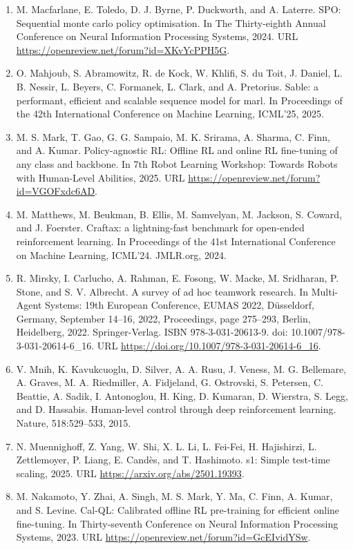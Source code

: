 \documentclass[11pt,UTF8,fontset=fandol]{ctexart}
\begin{document}
\begin{enumerate}[leftmargin=2em,itemsep=2pt]
\item M. Macfarlane, E. Toledo, D. J. Byrne, P. Duckworth, and A. Laterre. SPO: Sequential monte carlo policy optimisation. In The Thirty-eighth Annual Conference on Neural Information Processing Systems, 2024. URL \url{https://openreview.net/forum?id=XKvYcPPH5G}.
\item O. Mahjoub, S. Abramowitz, R. de Kock, W. Khlifi, S. du Toit, J. Daniel, L. B. Nessir, L. Beyers, C. Formanek, L. Clark, and A. Pretorius. Sable: a performant, efficient and scalable sequence model for marl. In Proceedings of the 42th International Conference on Machine Learning, ICML'25, 2025.
\item M. S. Mark, T. Gao, G. G. Sampaio, M. K. Srirama, A. Sharma, C. Finn, and A. Kumar. Policy-agnostic RL: Offline RL and online RL fine-tuning of any class and backbone. In 7th Robot Learning Workshop: Towards Robots with Human-Level Abilities, 2025. URL \url{https://openreview.net/forum?id=VGOFxdc6AD}.
\item M. Matthews, M. Beukman, B. Ellis, M. Samvelyan, M. Jackson, S. Coward, and J. Foerster. Craftax: a lightning-fast benchmark for open-ended reinforcement learning. In Proceedings of the 41st International Conference on Machine Learning, ICML'24. JMLR.org, 2024.
\item R. Mirsky, I. Carlucho, A. Rahman, E. Fosong, W. Macke, M. Sridharan, P. Stone, and S. V. Albrecht. A survey of ad hoc teamwork research. In Multi-Agent Systems: 19th European Conference, EUMAS 2022, D\"usseldorf, Germany, September 14--16, 2022, Proceedings, page 275--293, Berlin, Heidelberg, 2022. Springer-Verlag. ISBN 978-3-031-20613-9. doi: 10.1007/978-3-031-20614-6\_16. URL \url{https://doi.org/10.1007/978-3-031-20614-6_16}.
\item V. Mnih, K. Kavukcuoglu, D. Silver, A. A. Rusu, J. Veness, M. G. Bellemare, A. Graves, M. A. Riedmiller, A. Fidjeland, G. Ostrovski, S. Petersen, C. Beattie, A. Sadik, I. Antonoglou, H. King, D. Kumaran, D. Wierstra, S. Legg, and D. Hassabis. Human-level control through deep reinforcement learning. Nature, 518:529--533, 2015.
\item N. Muennighoff, Z. Yang, W. Shi, X. L. Li, L. Fei-Fei, H. Hajishirzi, L. Zettlemoyer, P. Liang, E. Cand\`es, and T. Hashimoto. s1: Simple test-time scaling, 2025. URL \url{https://arxiv.org/abs/2501.19393}.
\item M. Nakamoto, Y. Zhai, A. Singh, M. S. Mark, Y. Ma, C. Finn, A. Kumar, and S. Levine. Cal-QL: Calibrated offline RL pre-training for efficient online fine-tuning. In Thirty-seventh Conference on Neural Information Processing Systems, 2023. URL \url{https://openreview.net/forum?id=GcEIvidYSw}.

\end{enumerate}
\end{document}
